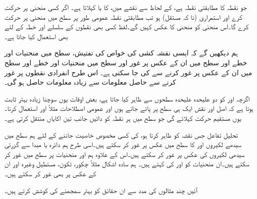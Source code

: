  جو نقطہ  کا مطابقتی نقطہ ہے،   کے لحاظ سے نقشے میں،  کا   یا  کہلاتا ہے۔ اگر  کسی منحنی پر حرکت کرے اور  استمراری (نا کہ مستقل)  ہو تب مطابقتی نقطہ  عمومی طور پر سطح  میں منحنی  پر حرکت کرے گا۔اس منحنی کو منحنی  کا عکس کہیں گے۔لفظ  کسی بھی نقطوں کے سلسلے اور خطہ کے لئے بھی استعمال کیا جاتا ہے۔ 

ہم دیکھیں گے کہ ایسی نقشہ کشی کی خواص کی تفتیش،   سطح میں منحنیات اور خطے اور   سطح میں ان کے عکس پر غور اور  سطح میں منحنیات اور خطے اور   سطح میں ان کے عکس پر غور  کرنے سے  کی جا سکتی ہے۔ اس طرح  انفرادی نقطوں پر غور کرنے سے حاصل معلومات سے  زیادہ معلومات حاصل ہو گی۔

اگرچہ   اور  کو دو علیحدہ علیحدہ سطحوں سے ظاہر کیا جاتا ہے، بعض اوقات یوں  سوچنا زیادہ بہتر ثابت ہوتا ہے  کہ اصل اور نقش ایک ہی سطح پر پائے جاتے ہوں اور  عمومی اصطلاحات مثلاً  اور  استعمال کرنا۔یوں    مستقیم حرکت کہلائے گی جو  سطح میں ہر نقطہ کو دائیں جانب تین اکایاں منتقل کرتی ہے۔

تحلیل تفاعل  جس نقشہ کو ظاہر کرتا ہو، کی کسی مخصوص  خاصیت  جاننے کے لئے ہم  سطح میں سیدھے لکیروں  اور  کا  سطح میں عکس پر غور کر سکتے ہیں۔اسی طرح ہم دائرہ  یا مبدا سے گزرتی سیدھی لکیروں کی عکس پر غور کر سکتے ہیں۔اس کے علاوہ ہم  اور  منحنیات پر  سطح میں غور کر سکتے ہیں۔ان منحنیات کو  اور  کی  کہتے ہیں۔ ہم سادہ اشکال مثلاً چکور، تکون، مستطیل وغیرہ اور ان کے عکس پر بھی غور کر سکتے ہیں۔

آئیں چند مثالوں کی مدد سے ان حقائق کو بہتر سمجھنے کی کوشش کرتے ہیں۔

